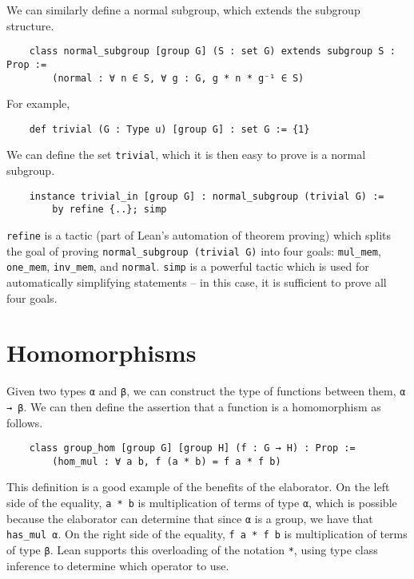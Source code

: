 \documentclass[runningheads,a4paper]{llncs}
\renewcommand{\-}{\setminus}
\begin{document}
We can similarly define a normal subgroup, which extends the subgroup structure.

\begin{lstlisting}
    class normal_subgroup [group G] (S : set G) extends subgroup S : Prop :=
        (normal : ∀ n ∈ S, ∀ g : G, g * n * g⁻¹ ∈ S)
\end{lstlisting}

For example, 

\begin{lstlisting}
    def trivial (G : Type u) [group G] : set G := {1}
\end{lstlisting}

We can define the set \lstinline{trivial}, which it is then easy to prove is a normal subgroup.

\begin{lstlisting}
    instance trivial_in [group G] : normal_subgroup (trivial G) :=
        by refine {..}; simp
\end{lstlisting}

\lstinline{refine} is a tactic (part of Lean's automation of theorem proving) which splits the goal of proving \lstinline{normal_subgroup (trivial G)} into four goals: \lstinline{mul_mem}, \lstinline{one_mem}, \lstinline{inv_mem}, and \lstinline{normal}. \lstinline{simp} is a powerful tactic which is used for automatically simplifying statements -- in this case, it is sufficient to prove all four goals.

\section{Homomorphisms}

Given two types \lstinline{α} and \lstinline{β}, we can construct the type of functions between them, \lstinline{α → β}. We can then define the assertion that a function is a homomorphism as follows.

\begin{lstlisting}
    class group_hom [group G] [group H] (f : G → H) : Prop :=
        (hom_mul : ∀ a b, f (a * b) = f a * f b)
\end{lstlisting}

This definition is a good example of the benefits of the elaborator. On the left side of the equality, \lstinline{a * b} is multiplication of terms of type \lstinline{α}, which is possible because the elaborator can determine that since \lstinline{α} is a group, we have that \lstinline{has_mul α}. On the right side of the equality, \lstinline{f a * f b} is multiplication of terms of type \lstinline{β}. Lean supports this overloading of the notation \lstinline{*}, using type class inference to determine which operator to use.\\
\end{document}
